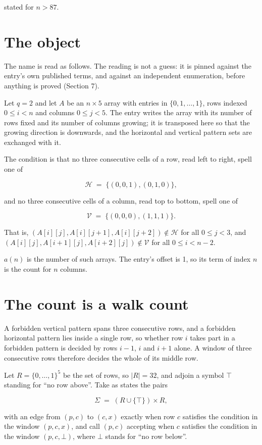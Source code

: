 \documentclass[11pt]{article}
\theoremstyle{definition}
\begin{document}
stated for $n > 87$.

\section{The object}

The name is read as follows. The reading is not a guess: it is pinned against the entry's own published terms, and against an independent enumeration, before anything is proved (Section 7).

Let $q = 2$ and let $A$ be an $n \times 5$ array with entries in $\{0,1,\dots,1\}$, rows indexed $0 \le i < n$ and columns $0 \le j < 5$. The entry writes the array with its number of rows fixed and its number of columns growing; it is transposed here so that the growing direction is downwards, and the horizontal and vertical pattern sets are exchanged with it.

The condition is that no three consecutive cells of a row, read left to right, spell one of

\[\mathcal{H} \;=\; \{(0,0,1), (0,1,0)\},\]

and no three consecutive cells of a column, read top to bottom, spell one of

\[\mathcal{V} \;=\; \{(0,0,0), (1,1,1)\}.\]

That is, $(A[i][j],A[i][j{+}1],A[i][j{+}2]) \notin \mathcal{H}$ for all $0 \le j < 3$, and $(A[i][j],A[i{+}1][j],A[i{+}2][j]) \notin \mathcal{V}$ for all $0 \le i < n-2$.

$a(n)$ is the number of such arrays. The entry's offset is 1, so its term of index $n$ is the count for $n$ columns.

\section{The count is a walk count}

A forbidden vertical pattern spans three consecutive rows, and a forbidden horizontal pattern lies inside a single row, so whether row $i$ takes part in a forbidden pattern is decided by rows $i-1$, $i$ and $i+1$ alone. A window of three consecutive rows therefore decides the whole of its middle row.

Let $R = \{0,\dots,1\}^{5}$ be the set of rows, so $|R| = 32$, and adjoin a symbol $\top$ standing for ``no row above''. Take as states the pairs

\[\Sigma \;=\; (R \cup \{\top\}) \times R,\]

with an edge from $(p,c)$ to $(c,x)$ exactly when row $c$ satisfies the condition in the window $(p,c,x)$, and call $(p,c)$ accepting when $c$ satisfies the condition in the window $(p,c,\bot)$, where $\bot$ stands for ``no row below''.
\end{document}
